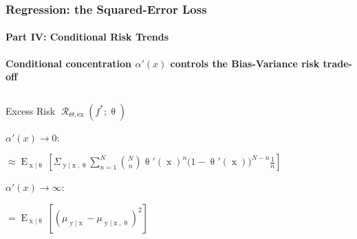 \documentclass[aspectratio=169,usenames,dvipsnames]{beamer}
\DeclareMathOperator{\xrm}{\mathrm{x}}
\DeclareMathOperator{\yrm}{\mathrm{y}}
\DeclareMathOperator{\Erm}{\mathrm{E}}
\DeclareMathOperator{\Rcal}{\mathcal{R}}
\begin{document}
\begin{frame}
\frametitle{Regression: the Squared-Error Loss}
\framesubtitle{Part IV: Conditional Risk Trends}

\textbf{Conditional concentration $\alpha'(x)$ controls the Bias-Variance risk trade-off}


\begin{columns}[c]

\begin{column}{0.55\linewidth}



\begin{block}{Excess Risk $\Rcal_{\Theta, \mathrm{ex}}(f^* ; \uptheta)$}

\small
\vspace{1em}
\underline{$\alpha'(x) \to 0$}:
\vspace{0.25em}

$\approx \Erm_{\xrm | \uptheta}\left[ \Sigma_{\yrm | \xrm,\uptheta} \sum_{n=1}^N \binom{N}{n} \uptheta'(\xrm)^n \big( 1 - \uptheta'(\xrm) \big)^{N-n} \frac{1}{n} \right] $

\vspace{2.25em}
\underline{$\alpha'(x) \to \infty$}:
\vspace{0.25em}

$= \Erm_{\xrm | \uptheta}\left[ \left( \mu_{\yrm | \xrm} - \mu_{\yrm | \xrm,\uptheta} \right)^2 \right]$

\end{block}


\normalsize

\end{column}

\begin{column}{0.45\linewidth}


\end{column}
\end{columns}
\end{frame}
\end{document}
